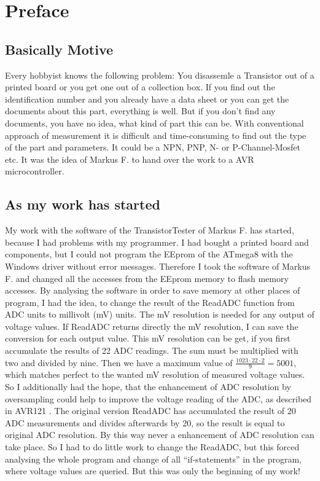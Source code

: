 \section*{Preface}
\subsection*{Basically Motive}
Every hobbyist knows the following problem: You disassemle a Transistor out of a printed board 
or you get one out of a collection box. 
If you find out the identification number and you already have a data sheet or you can get the documents about this part,
 everything is well.
But if you don't find any documents, you have no idea, what kind of part this can be.
With conventional approach of measurement it is difficult and time-consuming to find out the type of the part and parameters.
It could be a NPN, PNP, N- or P-Channel-Mosfet etc.
It was the idea of Markus F. to hand over the work to a AVR microcontroller.
\subsection*{As my work has started}
My work with the software of the TransistorTester of Markus F. \cite{Frejek} has started, because I had problems with 
my programmer. I had bought a printed board and components, but I could not program the EEprom of 
the ATmega8 with the Windows driver without error messages. Therefore I took the software of Markus F. and changed all the accesses
from the EEprom memory to flash memory accesses. By analysing the software in order to save memory
at other places of program, I had the idea, to change the result of the ReadADC function from ADC units
to millivolt (mV) units. The mV resolution is needed for any output of voltage values.
If ReadADC returns directly the mV resolution, I can save the conversion for each output value.
This mV resolution can be get, if you first accumulate the results of 22 ADC readings.
 The sum must be multiplied with two and divided by nine. Then we have a maximum value of \begin{math}\frac{1023\cdot22\cdot2}{9} = 5001\end{math},
which matches perfect to the wanted mV resolution of measured voltage values.
So I additionally had the hope, that the enhancement of ADC resolution by oversampling could help to improve the
voltage reading of the ADC, as described in AVR121 \cite{AVR121}.
The original version ReadADC has accumulated the result of 20 ADC measurements and divides afterwards by 20, 
so the result is equal to original ADC resolution. By this way never a enhancement of ADC resolution can take place.
So I had to do little work to change the ReadADC, but this forced analysing the whole program and change
of all ``if-statements'' in the program, where voltage values are queried.
But this was only the beginning of my work!\\

